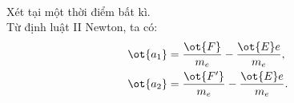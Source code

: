     \begin{loigiai}\\
    \begin{minipage}{0.5\textwidth}
         Xét tại một thời điểm bất kì.\\
    Từ định luật II Newton, ta có:
    \begin{equation*}
        \begin{aligned}
             \ot{a_1}&=\dfrac{\ot{F}}{m_e}-\dfrac{\ot{E}e}{m_e},\\
             \ot{a_2}&=\dfrac{\ot{F'}}{m_e}-\dfrac{\ot{E}e}{m_e}.
        \end{aligned}
    \end{equation*}  
    \end{minipage}
    \begin{minipage}{0.5\textwidth}
         

\begin{tikzpicture}[x=0.75pt,y=0.75pt,yscale=-1,xscale=1]


\end{tikzpicture}
\end{minipage}
\end{loigiai}
